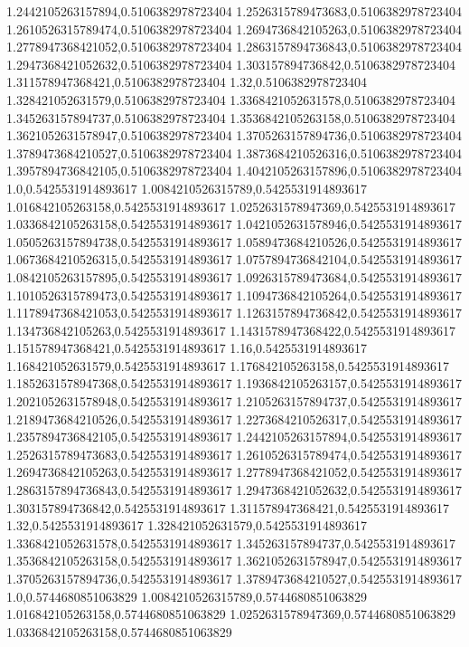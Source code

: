 1.2442105263157894,0.5106382978723404
1.2526315789473683,0.5106382978723404
1.2610526315789474,0.5106382978723404
1.2694736842105263,0.5106382978723404
1.2778947368421052,0.5106382978723404
1.2863157894736843,0.5106382978723404
1.2947368421052632,0.5106382978723404
1.303157894736842,0.5106382978723404
1.311578947368421,0.5106382978723404
1.32,0.5106382978723404
1.328421052631579,0.5106382978723404
1.3368421052631578,0.5106382978723404
1.345263157894737,0.5106382978723404
1.3536842105263158,0.5106382978723404
1.3621052631578947,0.5106382978723404
1.3705263157894736,0.5106382978723404
1.3789473684210527,0.5106382978723404
1.3873684210526316,0.5106382978723404
1.3957894736842105,0.5106382978723404
1.4042105263157896,0.5106382978723404
1.0,0.5425531914893617
1.0084210526315789,0.5425531914893617
1.016842105263158,0.5425531914893617
1.0252631578947369,0.5425531914893617
1.0336842105263158,0.5425531914893617
1.0421052631578946,0.5425531914893617
1.0505263157894738,0.5425531914893617
1.0589473684210526,0.5425531914893617
1.0673684210526315,0.5425531914893617
1.0757894736842104,0.5425531914893617
1.0842105263157895,0.5425531914893617
1.0926315789473684,0.5425531914893617
1.1010526315789473,0.5425531914893617
1.1094736842105264,0.5425531914893617
1.1178947368421053,0.5425531914893617
1.1263157894736842,0.5425531914893617
1.134736842105263,0.5425531914893617
1.1431578947368422,0.5425531914893617
1.151578947368421,0.5425531914893617
1.16,0.5425531914893617
1.168421052631579,0.5425531914893617
1.176842105263158,0.5425531914893617
1.1852631578947368,0.5425531914893617
1.1936842105263157,0.5425531914893617
1.2021052631578948,0.5425531914893617
1.2105263157894737,0.5425531914893617
1.2189473684210526,0.5425531914893617
1.2273684210526317,0.5425531914893617
1.2357894736842105,0.5425531914893617
1.2442105263157894,0.5425531914893617
1.2526315789473683,0.5425531914893617
1.2610526315789474,0.5425531914893617
1.2694736842105263,0.5425531914893617
1.2778947368421052,0.5425531914893617
1.2863157894736843,0.5425531914893617
1.2947368421052632,0.5425531914893617
1.303157894736842,0.5425531914893617
1.311578947368421,0.5425531914893617
1.32,0.5425531914893617
1.328421052631579,0.5425531914893617
1.3368421052631578,0.5425531914893617
1.345263157894737,0.5425531914893617
1.3536842105263158,0.5425531914893617
1.3621052631578947,0.5425531914893617
1.3705263157894736,0.5425531914893617
1.3789473684210527,0.5425531914893617
1.0,0.5744680851063829
1.0084210526315789,0.5744680851063829
1.016842105263158,0.5744680851063829
1.0252631578947369,0.5744680851063829
1.0336842105263158,0.5744680851063829
